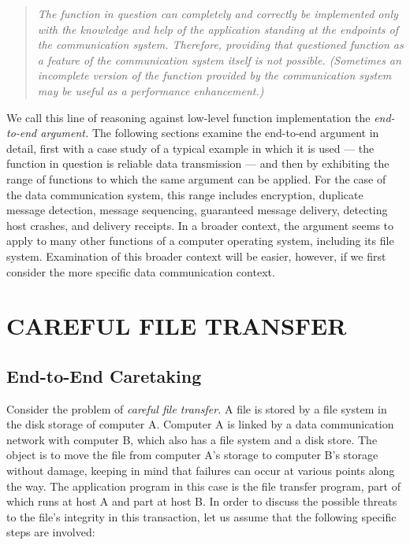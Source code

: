 \documentclass[a4paper,12pt,notitlepage,twoside,openright]{article}
\begin{document}
\begin{quote}
\it
The function in question can completely and correctly be
implemented only with the knowledge and help of the application standing
at the endpoints of the communication system. Therefore, providing that
questioned function as a feature of the communication system itself is
not possible. (Sometimes an incomplete version of the function provided
by the communication system may be useful as a performance
enhancement.)
\end{quote}

We call this line of reasoning against low-level function implementation
the \emph{end-to-end argument.} The following sections examine the
end-to-end argument in detail, first with a case study of a typical
example in which it is used --- the function in question is reliable
data transmission --- and then by exhibiting the range of functions to
which the same argument can be applied. For the case of the data
communication system, this range includes encryption, duplicate message
detection, message sequencing, guaranteed message delivery, detecting
host crashes, and delivery receipts. In a broader context, the argument
seems to apply to many other functions of a computer operating system,
including its file system. Examination of this broader context will be
easier, however, if we first consider the more specific data
communication context.

\hypertarget{careful-file-transfer}{%
\section{CAREFUL FILE TRANSFER}\label{careful-file-transfer}}

\hypertarget{end-to-end-caretaking}{%
\subsection{End-to-End Caretaking}\label{end-to-end-caretaking}}


Consider the problem of \emph{careful file transfer.} A file is stored
by a file system in the disk storage of computer A. Computer A is linked
by a data communication network with computer B, which also has a file
system and a disk store. The object is to move the file from computer
A's storage to computer B's storage without damage, keeping in mind that
failures can occur at various points along the way. The application
program in this case is the file transfer program, part of which runs at
host A and part at host B. In order to discuss the possible threats to
the file's integrity in this transaction, let us assume that the
following specific steps are involved:
\end{document}
